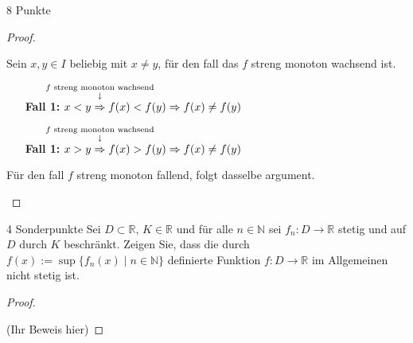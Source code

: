 \documentclass{../problemset}
\begin{document}
\begin{problem}{8 Punkte}
\begin{proof}
\begin{itemize}
		      Sein $x,y \in I$ beliebig mit $x \ne y$, für den fall das $f$ streng monoton wachsend ist.

		      \begin{itemize}
			      \item [\textbf{Fall 1:}] $x < y \annotated{$f$ streng monoton wachsend}{\Rightarrow} f(x) < f(y) \Rightarrow f(x) \ne f(y)$ \checkmark
			      \item [\textbf{Fall 1:}] $x > y \annotated{$f$ streng monoton wachsend}{\Rightarrow} f(x) > f(y) \Rightarrow f(x) \ne f(y)$ \checkmark
		      \end{itemize}

		      Für den fall $f$ streng monoton fallend, folgt dasselbe argument.
	\end{itemize}
\end{proof}
\end{problem}

\begin{problem}{4 Sonderpunkte}
Sei $D \subset \mathbb{R}$, $K \in \mathbb{R}$ und für alle $n \in \mathbb{N}$ sei $f_n : D \to \mathbb{R}$ stetig und auf $D$ durch $K$ beschränkt. Zeigen Sie, dass die durch $f(x) := \sup\{f_n(x) \mid n \in \mathbb{N}\}$ definierte Funktion $f : D \to \mathbb{R}$ im Allgemeinen nicht stetig ist.
\begin{proof}
	$ $

	(Ihr Beweis hier)
\end{proof}
\end{problem}
\end{document}
